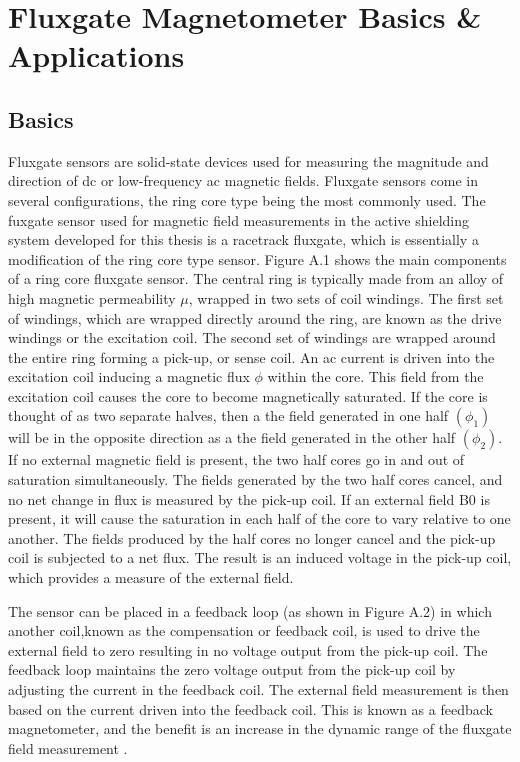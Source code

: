 \chapter{Fluxgate Magnetometer Basics \& Applications}
\section{Basics}
Fluxgate sensors are solid-state devices used for measuring the magnitude and direction of dc or low-frequency ac magnetic fields. Fluxgate sensors come in several configurations, the ring core type being the most commonly used. The fuxgate sensor used for magnetic field measurements in
the active shielding system developed for this thesis is a racetrack  fluxgate, which is essentially a modification of the ring core type sensor. Figure A.1 shows the main components of a ring core  fluxgate sensor. The central ring is typically made from an alloy of high magnetic permeability \(\mu\), wrapped in two sets of coil windings. The first set of windings, which are wrapped directly around the ring, are known as the drive windings or the excitation coil. The second set of windings are wrapped around the entire ring forming a pick-up, or sense coil. An ac current is driven into the excitation coil inducing a magnetic  flux \(\phi\) within the core. This field from the excitation coil causes the core to become magnetically saturated. If the core is thought of as two separate halves, then a the field generated in one half \((\phi_1)\) will be in the opposite direction as a the field generated in the other half \((\phi_2)\). If no external magnetic field is present, the two half cores go in and out of saturation simultaneously. The fields generated by the two half cores cancel, and no net change in  flux is measured by the pick-up coil. If an external field B0 is present, it will cause the saturation in each half of the core to vary relative to one another. The fields produced by the half cores no longer cancel and the pick-up coil is subjected to a net  flux. The result is an induced voltage in the pick-up coil, which provides a measure of the external field.



The sensor can be placed in a feedback loop (as shown in Figure A.2) in which another coil,known as the compensation or feedback coil, is used to drive the external field to zero resulting in no voltage output from the pick-up coil. The feedback loop maintains the zero voltage output from the pick-up coil by adjusting the current in the feedback coil. The external field measurement is then based on the current driven into the feedback coil. This is known as a feedback magnetometer, and the benefit is an increase in the dynamic range of the  fluxgate field measurement \cite{flux1}.

